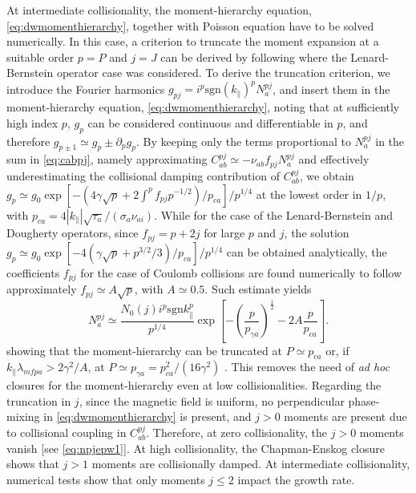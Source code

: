 %
At intermediate collisionality, the moment-hierarchy equation, \cref{eq:dwmomenthierarchy}, together with Poisson equation have to be solved numerically.
%
In this case, a criterion to truncate the moment expansion at a suitable order $p=P$ and $j=J$ can be derived by following  \citet{Schekochihin2016} where the Lenard-Bernstein operator case was considered.
%
To derive the truncation criterion, we introduce the Fourier harmonics $g_{pj}=i^p \text{sgn}(k_\parallel)^p N_a^{pj}$, and insert them in the moment-hierarchy equation, \cref{eq:dwmomenthierarchy}, noting that at sufficiently high index $p$, $g_p$ can be considered continuous and differentiable in $p$, and therefore $g_{p\pm 1} \simeq g_p \pm \partial_p g_p$.
%
By keeping only the terms proportional to $N_a^{pj}$ in the sum in \cref{eq:cabpj}, namely approximating $C_{ab}^{pj} \simeq - \nu_{ab} f_{pj} N_a^{pj}$ and effectively underestimating the collisional damping contribution of $C_{ab}^{pj}$, we obtain  $g_p\simeq g_0 \exp[-(4 \gamma \sqrt{p} + 2 \int^p f_{p j}p^{-1/2})/p_{ca}]/p^{1/4}$ at the lowest order in $1/p$, with $p_{ca}=4 |k_\parallel|\sqrt{\tau_a}/(\sigma_a \nu_{ai})$.
%
While for the case of the Lenard-Bernstein and Dougherty operators, since $f_{pj} = p+2j$ for large $p$ and $j$, the solution $g_p \simeq g_0 \exp[-4(\gamma \sqrt{p}+p^{3/2}/3)/p_{ca}]/p^{1/4}$ can be obtained analytically, the coefficients $f_{pj}$ for the case of Coulomb collisions are found numerically to follow approximately $f_{pj}\simeq A \sqrt{p}$, with $A \simeq 0.5$.
%
Such estimate yields
%
\begin{equation}
    N_a^{pj}\simeq \frac{N_0(j) i^p \text{sgn}k_\parallel^p}{p^{1/4}}\exp\left[{-\left( {\frac{p}{p_{\gamma a}}}\right)^\frac{1}{2}-2A\frac{p}{p_{c a}}}\right].
    \label{eq:coulpjspectrum}
\end{equation}
%
showing that the moment-hierarchy can be truncated at $P \simeq p_{c a}$ or, if $k_\parallel \lambda_{mfp a} > 2 \gamma^2/A$, at $P \simeq p_{\gamma a} = p_{c a}^2/(16\gamma^2)$ \citep{Zocco2011}.
%
This removes the need of \textit{ad hoc} closures for the moment-hierarchy even at low collisionalities.
%
Regarding the truncation in $j$, since the magnetic field is uniform, no perpendicular phase-mixing in \cref{eq:dwmomenthierarchy} is present, and $j>0$ moments are present due to collisional coupling in $C_{ab}^{pj}$.
%
Therefore, at zero collisionality, the $j>0$ moments vanish [see \cref{eq:npjepw1}].
%
At high collisionality, the Chapman-Enskog closure shows that $j>1$ moments are collisionally damped.
%
At intermediate collisionality, numerical tests show that only moments $j\le 2$ impact the growth rate.
%


